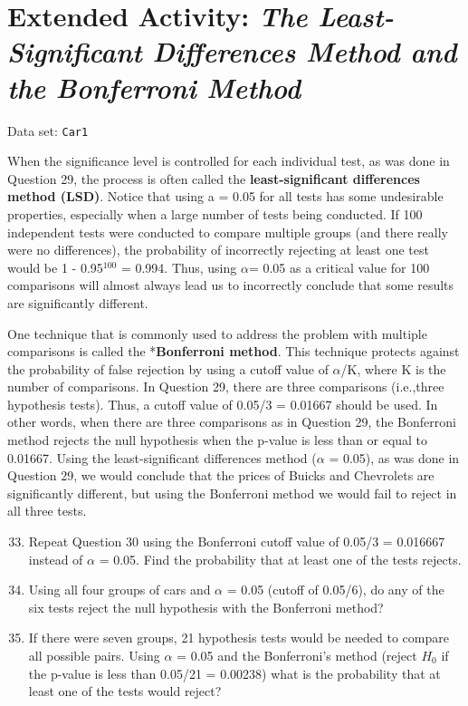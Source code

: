 \documentclass[
]{report}
\begin{document}
\section*{\texorpdfstring{Extended Activity: \emph{The Least-Significant Differences Method and the Bonferroni Method}}{Extended Activity: The Least-Significant Differences Method and the Bonferroni Method}}\label{extended-activity-the-least-significant-differences-method-and-the-bonferroni-method}

Data set: \texttt{Car1}

When the significance level is controlled for each individual test, as was done in Question 29, the process is often called the \textbf{least-significant differences method (LSD)}. Notice that using a = 0.05 for all tests has some undesirable properties, especially when a large number of tests being conducted. If 100 independent tests were conducted to compare multiple groups (and there really were no differences), the probability of incorrectly rejecting at least one test would be 1 - 0.95\(^{100}\) = 0.994. Thus, using \(\alpha\)= 0.05 as a critical value for 100 comparisons will almost always lead us to incorrectly conclude that some results are significantly different.

One technique that is commonly used to address the problem with multiple comparisons is called the *\textbf{Bonferroni method}. This technique protects against the probability of false rejection by using a cutoff value of \(\alpha\)/K, where K is the number of comparisons. In Question 29, there are three comparisons (i.e.,three hypothesis tests). Thus, a cutoff value of 0.05/3 = 0.01667 should be used. In other words, when there are three comparisons as in Question 29, the Bonferroni method rejects the null hypothesis when the p-value is less than or equal to 0.01667. Using the least-significant differences method (\(\alpha\) = 0.05), as was done in Question 29, we would conclude that the prices of Buicks and Chevrolets are significantly different, but using the Bonferroni method we would fail to reject in all three tests.

\begin{enumerate}
  \setcounter{enumi}{32}
  \item Repeat Question 30 using the Bonferroni cutoff value of 0.05/3 = 0.016667 instead of $\alpha$ = 0.05. Find the probability that at least one of the tests rejects.
  \item Using all four groups of cars and $\alpha$ = 0.05 (cutoff of 0.05/6), do any of the six tests reject the null hypothesis with the Bonferroni method?
  \item If there were seven groups, 21 hypothesis tests would be needed to compare all possible pairs. Using $\alpha$ = 0.05 and the Bonferroni’s method (reject $H_0$ if the p-value is less than 0.05/21 = 0.00238) what is the probability that at least one of the tests would reject?
\end{enumerate}
\end{document}
